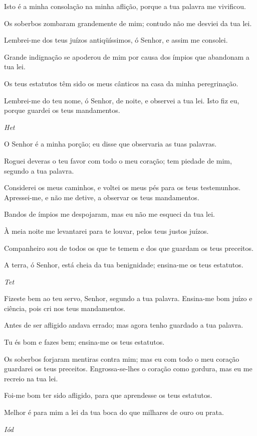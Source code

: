 Isto é a minha consolação na minha aflição, porque a tua palavra
me vivificou.

Os soberbos zombaram grandemente de mim; contudo não me desviei
da tua lei.

Lembrei-me dos teus juízos antiqüíssimos, ó Senhor, e assim me
consolei.

Grande indignação se apoderou de mim por causa dos ímpios que
abandonam a tua lei.

Os teus estatutos têm sido os meus cânticos na casa da minha
peregrinação.

Lembrei-me do teu nome, ó Senhor, de noite, e observei a tua lei.
Isto fiz eu, porque guardei os teus mandamentos.

\bigskip
\centerline{\emph{Het}}

O Senhor é a minha porção; eu disse que observaria as tuas
palavras.

Roguei deveras o teu favor com todo o meu coração; tem piedade de
mim, segundo a tua palavra.

Considerei os meus caminhos, e voltei os meus pés para os teus
testemunhos. Apressei-me, e não me detive, a observar os teus
mandamentos.

Bandos de ímpios me despojaram, mas eu não me esqueci da tua lei.

À meia noite me levantarei para te louvar, pelos teus justos
juízos.

Companheiro sou de todos os que te temem e dos que guardam os
teus preceitos.

A terra, ó Senhor, está cheia da tua benignidade; ensina-me os
teus estatutos.

\bigskip
\centerline{\emph{Tet}}

Fizeste bem ao teu servo, Senhor, segundo a tua palavra.
Ensina-me bom juízo e ciência, pois cri nos teus mandamentos.

Antes de ser afligido andava errado; mas agora tenho guardado a
tua palavra.

Tu és bom e fazes bem; ensina-me os teus estatutos.

Os soberbos forjaram mentiras contra mim; mas eu com todo o meu
coração guardarei os teus preceitos. Engrossa-se-lhes o
coração como gordura, mas eu me recreio na tua lei.

Foi-me bom ter sido afligido, para que aprendesse os teus
estatutos.

Melhor é para mim a lei da tua boca do que milhares de ouro ou
prata.

\bigskip
\centerline{\emph{Iód}}


